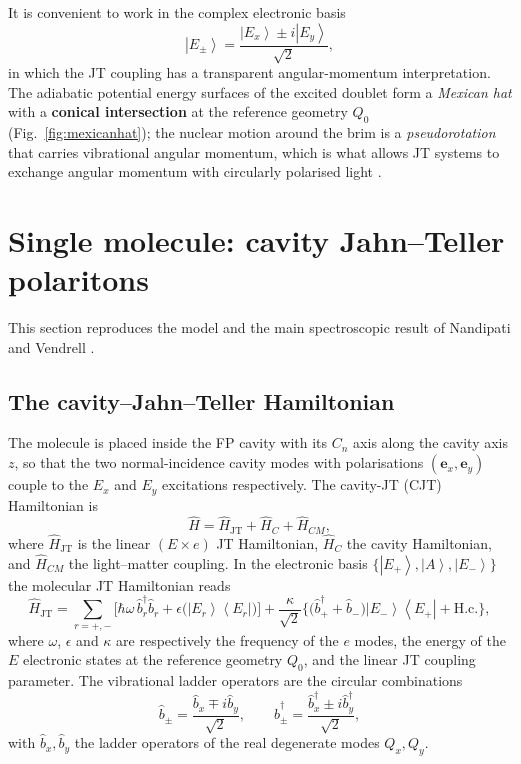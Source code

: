 \documentclass[12pt,a4paper]{article}
\newcommand{\JT}{\mathrm{JT}}
\newcommand{\ket}[1]{\left|#1\right\rangle}
\newcommand{\bra}[1]{\left\langle#1\right|}
\newcommand{\hc}{\mathrm{H.c.}}
\begin{document}
It is convenient to work in the complex electronic basis
\begin{equation}
  \ket{E_\pm}=\frac{\ket{E_x}\pm i\ket{E_y}}{\sqrt2},
  \label{eq:Epm}
\end{equation}
in which the JT coupling has a transparent angular-momentum interpretation.
The adiabatic potential energy surfaces of the excited doublet form a
\emph{Mexican hat} with a \textbf{conical intersection} at the reference
geometry $Q_0$ (Fig.~\ref{fig:mexicanhat}); the nuclear motion around the
brim is a \emph{pseudorotation} that carries vibrational angular momentum,
which is what allows JT systems to exchange angular momentum with circularly
polarised light \cite{Nandipati2021}.

\section{Single molecule: cavity Jahn--Teller polaritons}\label{sec:1mol}

This section reproduces the model and the main spectroscopic result of
Nandipati and Vendrell \cite{Nandipati2023}.

\subsection{The cavity--Jahn--Teller Hamiltonian}

The molecule is placed inside the FP cavity with its $C_n$ axis along the
cavity axis $z$, so that the two normal-incidence cavity modes with
polarisations $(\bm e_x,\bm e_y)$ couple to the $E_x$ and $E_y$ excitations
respectively. The cavity-JT (CJT) Hamiltonian is
\begin{equation}
  \hat H=\hat H_{\JT}+\hat H_C+\hat H_{CM},
  \label{eq:Htot1}
\end{equation}
where $\hat H_{\JT}$ is the linear $(E\times e)$ JT Hamiltonian, $\hat H_C$
the cavity Hamiltonian, and $\hat H_{CM}$ the light--matter coupling. In the
electronic basis $\{\ket{E_+},\ket{A},\ket{E_-}\}$ the molecular JT
Hamiltonian reads \cite{Nandipati2023}
\begin{equation}
  \hat H_{\JT}=\sum_{r=+,-}\Big[\hbar\omega\,\hat b^\dagger_r\hat b_r
   +\epsilon\big(\ket{E_r}\bra{E_r}\big)\Big]
   +\frac{\kappa}{\sqrt2}\Big\{\big(\hat b^\dagger_++\hat b_-\big)
   \ket{E_-}\bra{E_+}+\hc\Big\},
  \label{eq:HJT}
\end{equation}
where $\omega$, $\epsilon$ and $\kappa$ are respectively the frequency of the
$e$ modes, the energy of the $E$ electronic states at the reference geometry
$Q_0$, and the linear JT coupling parameter. The vibrational ladder
operators are the circular combinations
\begin{equation}
  \hat b_\pm=\frac{\hat b_x\mp i\hat b_y}{\sqrt2},\qquad
  \hat b^\dagger_\pm=\frac{\hat b^\dagger_x\pm i\hat b^\dagger_y}{\sqrt2},
  \label{eq:bpm}
\end{equation}
with $\hat b_{x},\hat b_{y}$ the ladder operators of the real degenerate
modes $Q_x,Q_y$.
\end{document}
